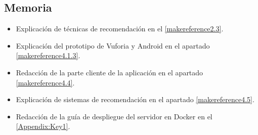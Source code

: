     \subsection{Memoria}
    \label{makereference7.4.3}
        \begin{itemize}
            \item Explicación de técnicas de recomendación en el \autoref{makereference2.3}.
            \item Explicación del prototipo de Vuforia y Android en el apartado \autoref{makereference4.1.3}.
            \item Redacción de la parte cliente de la aplicación en el apartado \autoref{makereference4.4}.
            \item Explicación de sistemas de recomendación en el apartado \autoref{makereference4.5}.
            \item Redacción de la guía de despliegue del servidor en Docker en el \autoref{Appendix:Key1}.
        \end{itemize}
